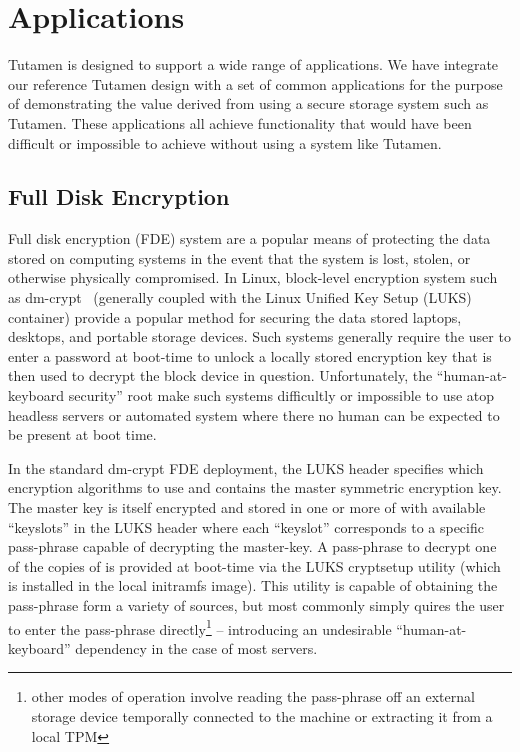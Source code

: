 \section{Applications}
\label{sec:apps}

Tutamen is designed to support a wide range of applications. We have
integrate our reference Tutamen design with a set of common
applications for the purpose of demonstrating the value derived from
using a secure storage system such as Tutamen. These applications all
achieve functionality that would have been difficult or impossible to
achieve without using a system like Tutamen.

\subsection{Full Disk Encryption}

Full disk encryption (FDE) system are a popular means of protecting
the data stored on computing systems in the event that the system is
lost, stolen, or otherwise physically compromised. In Linux,
block-level encryption system such as dm-crypt~\cite{dm-crypt}
(generally coupled with the Linux Unified Key Setup (LUKS)~\cite{luks}
container) provide a popular method for securing the data stored
laptops, desktops, and portable storage devices. Such systems
generally require the user to enter a password at boot-time to unlock
a locally stored encryption key that is then used to decrypt the block
device in question. Unfortunately, the ``human-at-keyboard security''
root make such systems difficultly or impossible to use atop headless
servers or automated system where there no human can be expected to be
present at boot time.

In the standard dm-crypt FDE deployment, the LUKS header specifies
which encryption algorithms to use and contains the master symmetric
encryption key. The master key is itself encrypted and stored in one
or more of with available ``keyslots'' in the LUKS header where each
``keyslot'' corresponds to a specific pass-phrase capable of
decrypting the master-key. A pass-phrase to decrypt one of the copies
of is provided at boot-time via the LUKS cryptsetup utility (which is
installed in the local initramfs image). This utility is capable of
obtaining the pass-phrase form a variety of sources, but most commonly
simply quires the user to enter the pass-phrase
directly\footnote{other modes of operation involve reading the
  pass-phrase off an external storage device temporally connected to
  the machine or extracting it from a local TPM} -- introducing an
undesirable ``human-at-keyboard'' dependency in the case of most
servers.

